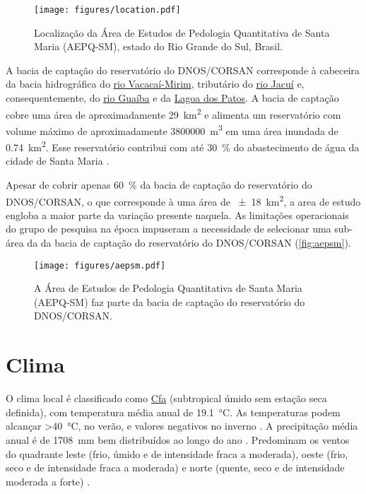 \begin{figure}[ht]
  \centering
  \texttt{[image: figures/location.pdf]}
  \caption{Localização da Área de Estudos de Pedologia Quantitativa de Santa 
  Maria (AEPQ-SM), estado do Rio Grande do Sul, Brasil.}
  \label{fig:location}
\end{figure}

A bacia de captação do reservatório do DNOS/CORSAN corresponde à cabeceira da bacia hidrográfica do 
\href{http://pt.wikipedia.org/wiki/Rio_Vacaca\%C3\%AD-Mirim}{rio Vacacaí-Mirim}, tributário do 
\href{http://pt.wikipedia.org/wiki/Rio_Jacu\%C3\%AD}{rio Jacuí} e, consequentemente, do 
\href{http://pt.wikipedia.org/wiki/Lago_Gua\%C3\%ADba}{rio Guaíba} e da 
\href{http://pt.wikipedia.org/wiki/Lagoa_dos_Patos}{Lagoa dos Patos}. A bacia de captação cobre uma 
área de aproximadamente \SI{29}{\square\kilo\metre} e alimenta um reservatório com volume máximo 
de aproximadamente \SI{3800000}{\cubic\metre} em uma área inundada de \SI{0,74}{\square\kilo\metre}.
Esse reservatório contribui com até \SI{30}{\percent} do abastecimento de água da cidade de Santa 
Maria \cite{Dias2003, DillEtAl2004, Miguel2010}.

Apesar de cobrir apenas \SI{60}{\percent} da bacia de captação do reservatório do DNOS/CORSAN, o 
que corresponde à uma área de \SI{\pm18}{\square\kilo\metre}, a area de estudo engloba a maior parte 
da variação presente naquela. As limitações operacionais do grupo de pesquisa na época impuseram a 
necessidade de selecionar uma sub-área da da bacia de captação do reservatório do DNOS/CORSAN 
(\autoref{fig:aepsm}).

\begin{figure}[ht]
  \centering
  \texttt{[image: figures/aepsm.pdf]}
  \caption{A Área de Estudos de Pedologia Quantitativa de Santa Maria (AEPQ-SM) faz parte da bacia 
  de captação do reservatório do DNOS/CORSAN.}
  \label{fig:aepsm}
\end{figure}

\tocless\section{Clima}

O clima local é classificado como \href{http://pt.wikipedia.org/wiki/Clima_subtropical_\%C3\%BAmido}{Cfa}
(subtropical úmido sem estação seca definida), com temperatura média anual de \SI{19,1}{\celsius}. 
As temperaturas podem alcançar \SI{>40}{\celsius}, no verão, e valores negativos no inverno 
\cite{HeldweinEtAl2009}. A precipitação média anual é de \SI{1708}{\milli\metre} bem distribuídos 
ao longo do ano \cite{Maluf2000}. Predominam os ventos do quadrante leste (frio, úmido e de 
intensidade fraca a moderada), oeste (frio, seco e de intensidade fraca a moderada) e norte (quente,
seco e de intensidade moderada a forte) \cite{HeldweinEtAl2009}.

